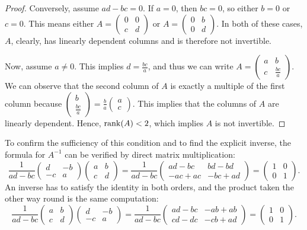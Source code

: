 \begin{proof}
  Conversely, assume $ad - bc = 0$. If $a = 0$, then $bc = 0$, so either $b = 0$ or $c = 0$. This means either $A = \left(\begin{smallmatrix} 0 & 0 \\ c & d \end{smallmatrix}\right)$ or $A = \left(\begin{smallmatrix} 0 & b \\ 0 & d \end{smallmatrix}\right)$. In both of these cases, $A$, clearly, has linearly dependent columns and is therefore not invertible.

  Now, assume $a \neq 0$. This implies $d = \frac{bc}{a}$, and thus we can write $A = \left(\begin{smallmatrix} a & b \\ c & \frac{bc}{a} \end{smallmatrix}\right)$. We can observe that the second column of $A$ is exactly a multiple of the first column because $\left(\begin{smallmatrix} b \\ \frac{bc}{a} \end{smallmatrix}\right) = \frac{b}{a} \left(\begin{smallmatrix} a \\ c \end{smallmatrix}\right)$. This implies that the columns of $A$ are linearly dependent. Hence, $\operatorname{rank}(A) < 2$, which implies $A$ is not invertible.
\end{proof}

To confirm the sufficiency of this condition and to find the explicit inverse, the formula for $A^{-1}$ can be verified by direct matrix multiplication:
\[
\frac{1}{ad-bc} \begin{pmatrix} d & -b \\ -c & a \end{pmatrix} \begin{pmatrix} a & b \\ c & d \end{pmatrix} = \frac{1}{ad-bc} \begin{pmatrix} ad-bc & bd-bd \\ -ac+ac & -bc+ad \end{pmatrix} = \begin{pmatrix} 1 & 0 \\ 0 & 1 \end{pmatrix}.
\]
An inverse has to satisfy the identity in both orders, and the product taken the other way round is the same computation:
\[
\frac{1}{ad-bc} \begin{pmatrix} a & b \\ c & d \end{pmatrix} \begin{pmatrix} d & -b \\ -c & a \end{pmatrix} = \frac{1}{ad-bc} \begin{pmatrix} ad-bc & -ab+ab \\ cd-dc & -cb+ad \end{pmatrix} = \begin{pmatrix} 1 & 0 \\ 0 & 1 \end{pmatrix}.
\]

